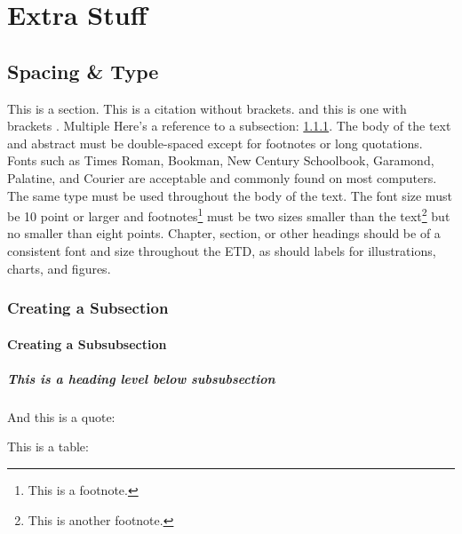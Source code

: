 \chapter{Extra Stuff}
\blindtext



\section{Spacing \& Type}
\label{sec:section}

This is a section. This is a citation without brackets. and this is one with brackets \cite{A}. Multiple \cite{A,B,C} Here's a reference to a subsection: \ref{sec:subsection}. The body of the text and abstract must be double-spaced except for footnotes or long quotations. Fonts such as Times Roman, Bookman, New Century Schoolbook, Garamond, Palatine, and Courier are acceptable and commonly found on most computers. The same type must be used throughout the body of the text. The font size must be 10 point or larger and footnotes\footnote{This is a footnote.} must be two sizes smaller than the text\footnote{This is another footnote.} but no smaller than eight points. Chapter, section, or other headings should be of a consistent font and size throughout the ETD, as should labels for illustrations, charts, and figures.  

\subsection{Creating a Subsection}
\label{sec:subsection}

\subsubsection{Creating a Subsubsection}

\paragraph{This is a heading level below subsubsection}

And this is a quote: 
%
\begin{quote}
\blindtext
\end{quote}

This is a table:
\makeatletter
\let\@currsize\normalsize
\makeatother


